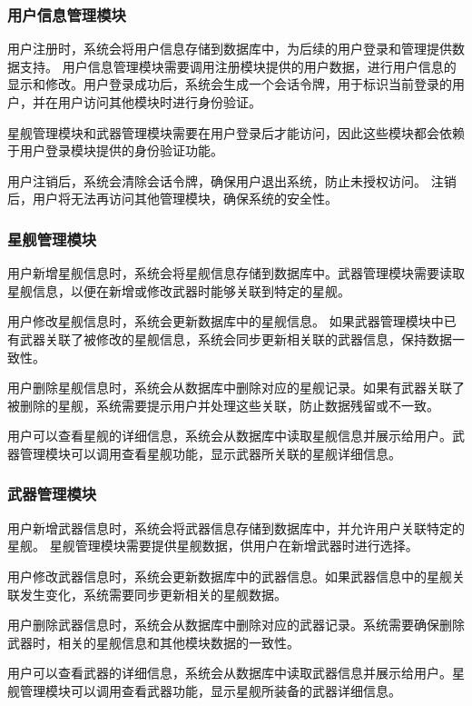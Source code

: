 \documentclass{base}
\begin{document}
\subsubsection{用户信息管理模块}

用户注册时，系统会将用户信息存储到数据库中，为后续的用户登录和管理提供数据支持。
用户信息管理模块需要调用注册模块提供的用户数据，进行用户信息的显示和修改。用户登录成功后，系统会生成一个会话令牌，用于标识当前登录的用户，并在用户访问其他模块时进行身份验证。

星舰管理模块和武器管理模块需要在用户登录后才能访问，因此这些模块都会依赖于用户登录模块提供的身份验证功能。

用户注销后，系统会清除会话令牌，确保用户退出系统，防止未授权访问。
注销后，用户将无法再访问其他管理模块，确保系统的安全性。
\subsubsection{星舰管理模块}

用户新增星舰信息时，系统会将星舰信息存储到数据库中。武器管理模块需要读取星舰信息，以便在新增或修改武器时能够关联到特定的星舰。

用户修改星舰信息时，系统会更新数据库中的星舰信息。
如果武器管理模块中已有武器关联了被修改的星舰信息，系统会同步更新相关联的武器信息，保持数据一致性。

用户删除星舰信息时，系统会从数据库中删除对应的星舰记录。如果有武器关联了被删除的星舰，系统需要提示用户并处理这些关联，防止数据残留或不一致。

用户可以查看星舰的详细信息，系统会从数据库中读取星舰信息并展示给用户。武器管理模块可以调用查看星舰功能，显示武器所关联的星舰详细信息。

\subsubsection{武器管理模块}

用户新增武器信息时，系统会将武器信息存储到数据库中，并允许用户关联特定的星舰。
星舰管理模块需要提供星舰数据，供用户在新增武器时进行选择。

用户修改武器信息时，系统会更新数据库中的武器信息。如果武器信息中的星舰关联发生变化，系统需要同步更新相关的星舰数据。

用户删除武器信息时，系统会从数据库中删除对应的武器记录。系统需要确保删除武器时，相关的星舰信息和其他模块数据的一致性。


用户可以查看武器的详细信息，系统会从数据库中读取武器信息并展示给用户。星舰管理模块可以调用查看武器功能，显示星舰所装备的武器详细信息。
\end{document}
